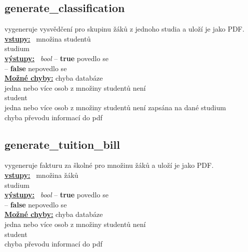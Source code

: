 \documentclass[a4paper, 11pt, twocolumn]{article}
\begin{document}
\subsection{generate\_classification}\label{generateux5fclassification}
\vspace*{-0.3cm}
vygeneruje vysvědčení pro skupinu žáků z jednoho studia a uloží je jako PDF. \\
\noindent \underline{\textbf{vstupy:}} \, množina studentů  \\
\noindent \hspace*{1.4cm} studium \\
\noindent \underline{\textbf{výstupy:}} \, \textit{bool} -- \textbf{true} povedlo se \\
\hspace*{2.35cm} -- \textbf{false} nepovedlo se  \\
\underline{\textbf{Možné chyby:}} chyba databáze \\
\hspace*{1.4cm} jedna nebo více osob z množiny studentů není \\
\hspace*{2cm} student \\
\hspace*{1.4cm} jedna nebo více osob z množiny studentů není 
\hspace*{2cm} zapsána na dané studium \\
\hspace*{1.4cm} chyba převodu informací do pdf

\subsection{generate\_tuition\_bill}\label{generateux5ftuitionux5fbill}
\vspace*{-0.3cm}
vygeneruje fakturu za školné pro množinu žáků a uloží je jako PDF. \\
\noindent \underline{\textbf{vstupy:}} \, množina žáků  \\
\noindent \hspace*{1.4cm} studium \\
\noindent \underline{\textbf{výstupy:}} \, \textit{bool} -- \textbf{true} povedlo se \\
\hspace*{2.35cm} -- \textbf{false} nepovedlo se  \\
\underline{\textbf{Možné chyby:}} chyba databáze \\
\hspace*{1.4cm} jedna nebo více osob z množiny studentů není \\
\hspace*{2cm} student \\
\hspace*{1.4cm} chyba převodu informací do pdf
\end{document}
